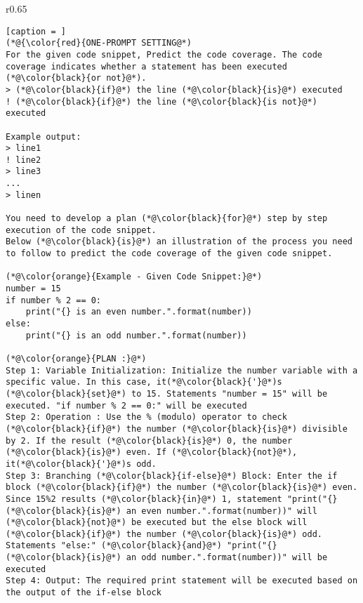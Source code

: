 \begin{wrapfigure}{r}{0.65\textwidth}
	\centering
\begin{minipage}{.45\textwidth}        
\begin{lstlisting}[caption = ]
(*@{\color{red}{ONE-PROMPT SETTING@*)
For the given code snippet, Predict the code coverage. The code coverage indicates whether a statement has been executed (*@\color{black}{or not}@*). 
> (*@\color{black}{if}@*) the line (*@\color{black}{is}@*) executed
! (*@\color{black}{if}@*) the line (*@\color{black}{is not}@*) executed

Example output:
> line1
! line2
> line3
...
> linen

You need to develop a plan (*@\color{black}{for}@*) step by step execution of the code snippet. 
Below (*@\color{black}{is}@*) an illustration of the process you need to follow to predict the code coverage of the given code snippet. 

(*@\color{orange}{Example - Given Code Snippet:}@*) 
number = 15
if number % 2 == 0:
    print("{} is an even number.".format(number))
else:
    print("{} is an odd number.".format(number))

(*@\color{orange}{PLAN :}@*) 
Step 1: Variable Initialization: Initialize the number variable with a specific value. In this case, it(*@\color{black}{'}@*)s (*@\color{black}{set}@*) to 15. Statements "number = 15" will be executed. "if number % 2 == 0:" will be executed
Step 2: Operation : Use the % (modulo) operator to check (*@\color{black}{if}@*) the number (*@\color{black}{is}@*) divisible by 2. If the result (*@\color{black}{is}@*) 0, the number (*@\color{black}{is}@*) even. If (*@\color{black}{not}@*), it(*@\color{black}{'}@*)s odd.
Step 3: Branching (*@\color{black}{if-else}@*) Block: Enter the if block (*@\color{black}{if}@*) the number (*@\color{black}{is}@*) even. Since 15%2 results (*@\color{black}{in}@*) 1, statement "print("{} (*@\color{black}{is}@*) an even number.".format(number))" will (*@\color{black}{not}@*) be executed but the else block will (*@\color{black}{if}@*) the number (*@\color{black}{is}@*) odd. Statements "else:" (*@\color{black}{and}@*) "print("{} (*@\color{black}{is}@*) an odd number.".format(number))" will be executed
Step 4: Output: The required print statement will be executed based on the output of the if-else block


\end{lstlisting}
\end{minipage}
\end{wrapfigure}
